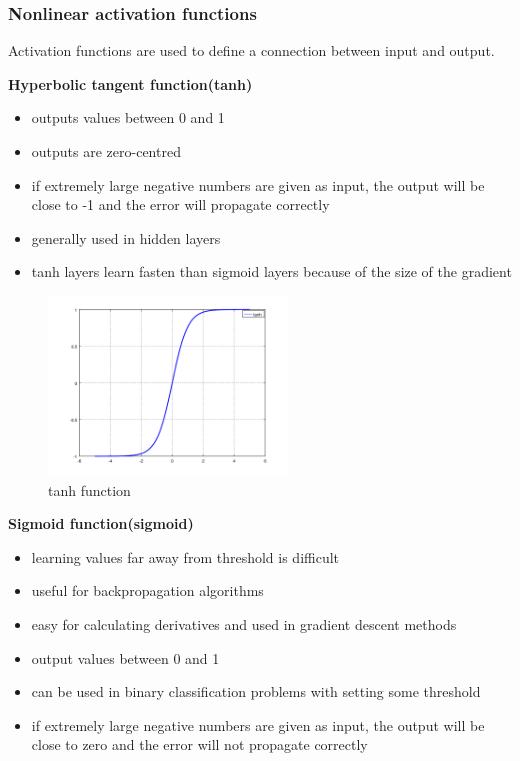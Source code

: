 \subsubsection{Nonlinear activation functions\cite{david,hiddenfunctions,backprop}}
\label{transfer}
Activation functions are used to define a connection between input and output.

\textbf{Hyperbolic tangent function(tanh)}
\begin{itemize}
	\item outputs values between 0 and 1
	\item outputs are zero-centred
	\item if extremely large negative numbers are given as input, the output will be close to -1 and the error will propagate correctly
	\item generally used in hidden layers
	\item tanh layers learn fasten than sigmoid layers because of the size of the gradient
\end{itemize}

\begin{figure}[h]
	\begin{center}
		\includegraphics[width=240px,height=180px]{src/img/state/tanh}
		\caption{tanh function} \label{fig:tanh}
    \end{center}
\end{figure}


\textbf{Sigmoid function(sigmoid)}
\begin{itemize}
  \item learning values far away from threshold is difficult
  \item useful for backpropagation algorithms
  \item easy for calculating derivatives and used in gradient descent methods
  \item output values between 0 and 1
  \item can be used in binary classification problems with setting some threshold
  \item if extremely large negative numbers are given as input, the output will be close to zero and the error will not propagate correctly
\end{itemize}

